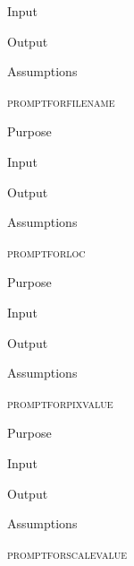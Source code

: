 \documentclass[pdftex, 11pt]{article}
\begin{document}
\begin{description}
\begin{description}
			\item{Input}


			\item{Output}


			\item{Assumptions}


		\end{description}



	\item{\textsc{promptforfilename}}
		\begin{description}
			\item{Purpose}


			\item{Input}


			\item{Output}


			\item{Assumptions}


		\end{description}



	\item{\textsc{promptforloc}}
		\begin{description}
			\item{Purpose}


			\item{Input}


			\item{Output}


			\item{Assumptions}


		\end{description}



	\item{\textsc{promptforpixvalue}}
		\begin{description}
			\item{Purpose}


			\item{Input}


			\item{Output}


			\item{Assumptions}


		\end{description}



	\item{\textsc{promptforscalevalue}}


\end{description}
\end{document}
